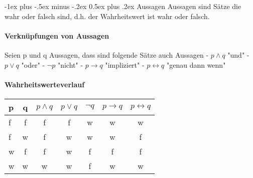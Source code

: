 \documentclass[a4paper]{article}
\makeatletter
\renewcommand{\section}{\@startsection{section}{1}{0mm}%
                                {-1ex plus -.5ex minus -.2ex}%
                                {0.5ex plus .2ex}%
                                {\normalfont\large\bfseries}}
\makeatother
\begin{document}
\raggedright
\footnotesize
\begin{multicols}{3}
    
    \setlength{\premulticols}{1pt}
    \setlength{\postmulticols}{1pt}
    \setlength{\multicolsep}{1pt}
    \setlength{\columnsep}{2pt}
    
    \section{Aussagen}
    Aussagen sind Sätze die wahr oder falsch sind, d.h. der Wahrheitswert ist wahr oder falsch.
    
    \paragraph{Verknüpfungen von Aussagen}
    Seien p und q Aussagen, dass sind folgende Sätze auch Aussagen
    - $p \wedge q$ "und"
    - $p \vee q$ "oder"
    - $\neg p$ "nicht"
    - $p \rightarrow q$ "impliziert"
    - $p \leftrightarrow q$ "genau dann wenn"
    
    \paragraph{Wahrheitswerteverlauf}
    \begin{tabular}{ l | c | c | c | c | c | c }
        p & q & $p\wedge q$ & $p\vee q$ & $\neg q$ & $p\rightarrow q$ & $p\leftrightarrow q$ \\
        \hline
        f & f & f           & f         & w        & w                & w                    \\
        f & w & f           & w         & w        & w                & f                    \\
        w & f & f           & w         & f        & f                & f                    \\
        w & w & w           & w         & f        & w                & w                    \\
    \end{tabular}
    

\end{multicols}
\end{document}
